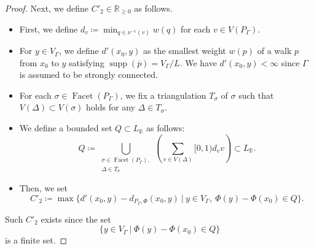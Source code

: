 \documentclass[ALCO,published]{cedram}
\theoremstyle{remark}
\begin{document}
\begin{proof}
Next, we define $C' _2 \in \mathbb{R}_{\ge 0}$ as follows. 
\begin{itemize}
\item 
First, we define $d_v \coloneqq  \min _{q \in \nu ^{-1}(v)} w(q)$ for each $v \in V(P_{\Gamma})$. 

\item
For $y \in V_{\Gamma}$, we define $d'(x_0, y)$ as the smallest weight $w(p)$ of 
a walk $p$ from $x_0$ to $y$ satisfying $\operatorname{supp}(\overline{p}) = V_{\Gamma} /L$.
We have $d'(x_0, y) < \infty$ since $\Gamma$ is assumed to be strongly connected. 

\item
For each $\sigma \in \operatorname{Facet}(P_{\Gamma})$, 
we fix a triangulation $T_{\sigma}$ of $\sigma$ such that $V(\Delta) \subset V(\sigma)$ holds for any $\Delta \in T_{\sigma}$. 

\item
We define a bounded set $Q \subset L_{\mathbb{R}}$ as follows: 
\[
Q \coloneqq  
\bigcup _{\substack{\sigma \in \operatorname{Facet}(P_{\Gamma}),\\ 
\Delta \in T_{\sigma}}}
\left( \sum _{v \in V(\Delta)}  [0,1) d_v v \right)
\subset L_{\mathbb{R}}. 
\]

\item
Then, we set 
\[
C' _2 \coloneqq  \max \bigl \{ d'(x_0, y) - d_{P_{\Gamma}, \Phi} ( x_0, y ) \ \big | \ 
y \in V_{\Gamma}, \ \Phi(y) - \Phi(x_0) \in Q \bigr \}. 
\]
\end{itemize}
Such $C' _2$ exists since the set
\[
\bigl \{ y \in V_{\Gamma} \ \big | \ \Phi(y) - \Phi(x_0) \in Q \bigr \}
\]
is a finite set. 


\end{proof}
\end{document}
